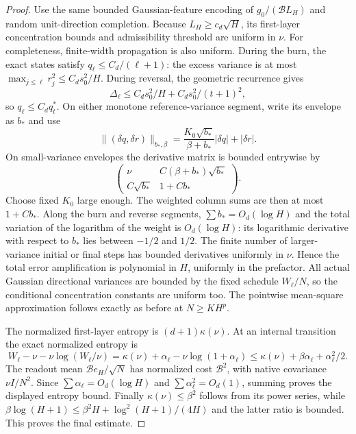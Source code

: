 \begin{proof}
Use the same bounded Gaussian-feature encoding of $g_0/(\mathcal B L_H)$ and random unit-direction completion. Because $L_H\ge c_d\sqrt H$, its first-layer concentration bounds and admissibility threshold are uniform in $\nu$. For completeness, finite-width propagation is also uniform. During the burn, the exact states satisfy $q_\ell\le C_d/(\ell+1)$: the excess variance is at most $\max_{j\le\ell}r_j^2\le C_ds_0^2/H$. During reversal, the geometric recurrence gives
\[
 \Delta_\ell\le C_ds_0^2/H+C_ds_0^2/(t+1)^2,
\]
so $q_\ell\le C_dq_t^*$. On either monotone reference-variance segment, write its envelope as $b_*$ and use
\[
 \| (\delta q,\delta r)\|_{b_*,\beta}
 =\frac{K_0\sqrt{b_*}}{\beta+b_*}|\delta q|+|\delta r|.
\]
On small-variance envelopes the derivative matrix is bounded entrywise by
\[
 \begin{pmatrix}
 \nu & C(\beta+b_*)\sqrt{b_*}\\
 C\sqrt{b_*} &1+Cb_*
 \end{pmatrix}.
\]
Choose fixed $K_0$ large enough. The weighted column sums are then at most $1+Cb_*$. Along the burn and reverse segments, $\sum b_*=O_d(\log H)$ and the total variation of the logarithm of the weight is $O_d(\log H)$: its logarithmic derivative with respect to $b_*$ lies between $-1/2$ and $1/2$. The finite number of larger-variance initial or final steps has bounded derivatives uniformly in $\nu$. Hence the total error amplification is polynomial in $H$, uniformly in the prefactor. All actual Gaussian directional variances are bounded by the fixed schedule $W_\ell/N$, so the conditional concentration constants are uniform too. The pointwise mean-square approximation follows exactly as before at $N\ge KH^p$.

The normalized first-layer entropy is $(d+1)\kappa(\nu)$. At an internal transition the exact normalized entropy is
\[
 W_\ell-\nu-\nu\log(W_\ell/\nu)
 =\kappa(\nu)+\alpha_\ell-\nu\log(1+\alpha_\ell)
 \le\kappa(\nu)+\beta\alpha_\ell+\alpha_\ell^2/2.
\]
The readout mean $\mathcal B e_H/\sqrt N$ has normalized cost $\mathcal B^2$, with native covariance $\nu I/N^2$. Since $\sum\alpha_\ell=O_d(\log H)$ and $\sum\alpha_\ell^2=O_d(1)$, summing proves the displayed entropy bound. Finally $\kappa(\nu)\le\beta^2$ follows from its power series, while
$\beta\log(H+1)\le\beta^2H+\log^2(H+1)/(4H)$ and the latter ratio is bounded. This proves the final estimate.
\end{proof}
